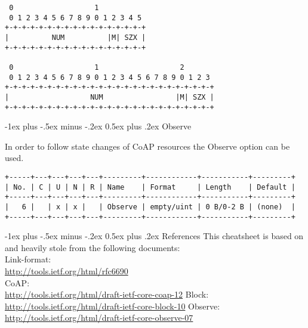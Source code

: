 \documentclass[10pt,landscape]{article}
\makeatletter
\renewcommand{\section}{\@startsection{section}{1}{0mm}%
                                {-1ex plus -.5ex minus -.2ex}%
                                {0.5ex plus .2ex}%
                                {\normalfont\large\bfseries}}
\makeatother
\begin{document}
\begin{multicols}{3}
{\begin{verbatim}
 0                   1
 0 1 2 3 4 5 6 7 8 9 0 1 2 3 4 5
+-+-+-+-+-+-+-+-+-+-+-+-+-+-+-+-+
|          NUM          |M| SZX |
+-+-+-+-+-+-+-+-+-+-+-+-+-+-+-+-+

 0                   1                   2
 0 1 2 3 4 5 6 7 8 9 0 1 2 3 4 5 6 7 8 9 0 1 2 3
+-+-+-+-+-+-+-+-+-+-+-+-+-+-+-+-+-+-+-+-+-+-+-+-+
|                   NUM                 |M| SZX |
+-+-+-+-+-+-+-+-+-+-+-+-+-+-+-+-+-+-+-+-+-+-+-+-+
\end{verbatim}
}

\section{Observe}

In order to follow state changes of CoAP resources the Observe option
can be used.

{\tiny
\begin{verbatim}
+-----+---+---+---+---+---------+------------+-----------+---------+
| No. | C | U | N | R | Name    | Format     | Length    | Default |
+-----+---+---+---+---+---------+------------+-----------+---------+
|   6 |   | x | x |   | Observe | empty/uint | 0 B/0-2 B | (none)  |
+-----+---+---+---+---+---------+------------+-----------+---------+
\end{verbatim}
}

\section{References}
This cheatsheet is based on and heavily stole from the following
documents:\\

Link-format:\\ \url{http://tools.ietf.org/html/rfc6690}\\
CoAP:\\ \url{http://tools.ietf.org/html/draft-ietf-core-coap-12}
Block:\\ \url{http://tools.ietf.org/html/draft-ietf-core-block-10}
Observe:\\ \url{http://tools.ietf.org/html/draft-ietf-core-observe-07}

%
%
\end{multicols}
\end{document}
